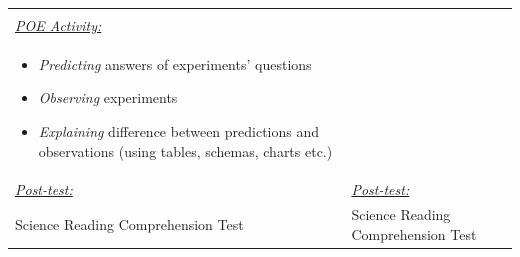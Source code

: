 \documentclass[11.5pt]{sig-alternate} %
\begin{document}
\begin{large}
\begin{table}[th]
\begin{tabular}{ll}
\begin{itemize}[noitemsep, topsep=0pt]
\end{itemize} \\
\underline{\textit{POE Activity:}} & \\
\begin{itemize}[noitemsep, topsep=0pt]
    \item \textit{Predicting} answers of experiments’ questions
    \item \textit{Observing} experiments
    \item \textit{Explaining} difference between predictions and observations (using tables, schemas, charts etc.)
\end{itemize} & \\
\underline{\textit{Post-test:}} & \underline{\textit{Post-test:}} \\
Science Reading Comprehension Test & Science Reading Comprehension Test \\ \hline
\end{tabular}
\end{table}


\end{large}
\end{document}
